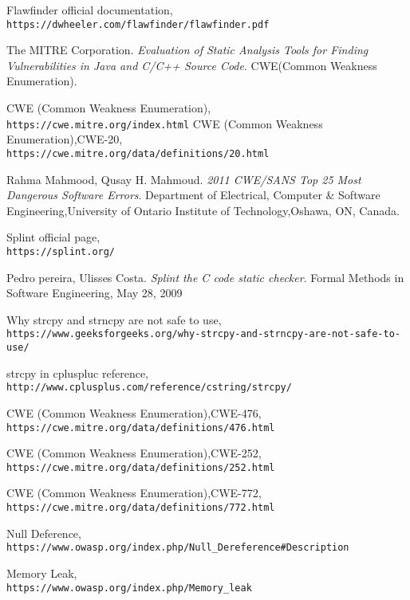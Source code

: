\documentclass[a4paper,12pt]{article}
\begin{document}



\begin{thebibliography}{}

   Flawfinder official documentation,\\\texttt{https://dwheeler.com/flawfinder/flawfinder.pdf}

The MITRE Corporation.
\textit{Evaluation of Static Analysis Tools for Finding Vulnerabilities in Java and C/C++
Source Code}.
CWE(Common
Weakness Enumeration)\cite{CWE}.

  CWE (Common
Weakness Enumeration),\\\texttt{https://cwe.mitre.org/index.html}
  CWE (Common
Weakness Enumeration),CWE-20,\\\texttt{https://cwe.mitre.org/data/definitions/20.html}
  
Rahma Mahmood, Qusay H. Mahmoud.
\textit{2011 CWE/SANS Top 25 Most Dangerous Software Errors}.
Department of Electrical, Computer \& Software Engineering,University of Ontario Institute of Technology,Oshawa, ON, Canada.

 Splint official page,\\\texttt{https://splint.org/}    

Pedro pereira, Ulisses Costa.
\textit{Splint the C code static checker}.
Formal Methods in Software Engineering, May 28, 2009

Why strcpy and strncpy are not safe to use,\\\texttt{https://www.geeksforgeeks.org/why-strcpy-and-strncpy-are-not-safe-to-use/}


strcpy in cpluspluc reference,\\\texttt{http://www.cplusplus.com/reference/cstring/strcpy/}
 
  CWE (Common
Weakness Enumeration),CWE-476,\\\texttt{https://cwe.mitre.org/data/definitions/476.html}

  CWE (Common
Weakness Enumeration),CWE-252,\\\texttt{https://cwe.mitre.org/data/definitions/252.html}

  CWE (Common
Weakness Enumeration),CWE-772,\\\texttt{https://cwe.mitre.org/data/definitions/772.html}

  Null Deference,\\\texttt{https://www.owasp.org/index.php/Null\_Dereference\#Description}

  Memory Leak,\\\texttt{https://www.owasp.org/index.php/Memory\_leak}

\end{thebibliography}
\end{document}
